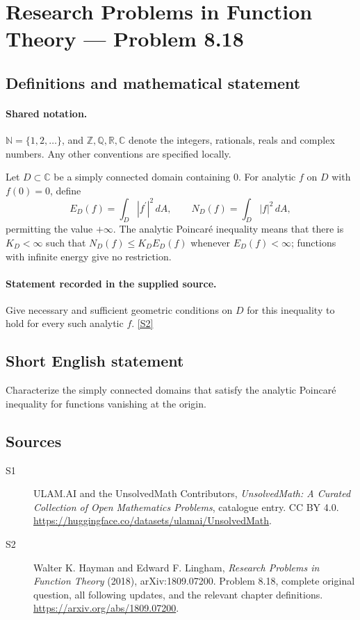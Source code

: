 \documentclass[11pt]{book}
\newcommand{\sref}[2]{\hyperlink{source:#1:#2}{[S#2]}}
\begin{document}
\section{Research Problems in Function Theory — Problem 8.18}\label{statement}

\subsection{Definitions and mathematical statement}

\paragraph{Shared notation.}$\mathbb N=\{1,2,\ldots\}$, and $\mathbb Z,\mathbb Q,\mathbb R,\mathbb C$ denote the integers, rationals, reals and complex numbers. Any other conventions are specified locally.


Let $D\subset\mathbb C$ be a simply connected domain containing $0$. For analytic $f$ on $D$ with $f(0)=0$, define \[E_D(f)=\int_D|f^{\prime}|^2\,dA,\qquad N_D(f)=\int_D|f|^2\,dA,\] permitting the value $+\infty$. The analytic Poincar\'e inequality means that there is $K_D<\infty$ such that $N_D(f)\le K_DE_D(f)$ whenever $E_D(f)<\infty$; functions with infinite energy give no restriction.
\paragraph{Statement recorded in the supplied source.}
Give necessary and sufficient geometric conditions on $D$ for this inequality to hold for every such analytic $f$. \sref{statement}{2}
\subsection{Short English statement}
Characterize the simply connected domains that satisfy the analytic Poincaré inequality for functions vanishing at the origin.
\subsection{Sources}
\begin{description}
\item[\hypertarget{source:statement:1}{S1}] ULAM.AI and the UnsolvedMath Contributors, \emph{UnsolvedMath: A Curated Collection of Open Mathematics Problems}, catalogue entry. CC BY 4.0. \url{https://huggingface.co/datasets/ulamai/UnsolvedMath}.
\item[\hypertarget{source:statement:2}{S2}] Walter K. Hayman and Edward F. Lingham, \emph{Research Problems in Function Theory} (2018), arXiv:1809.07200. Problem 8.18, complete original question, all following updates, and the relevant chapter definitions. \url{https://arxiv.org/abs/1809.07200}.
\end{description}
\label{end:statement}
\end{document}
